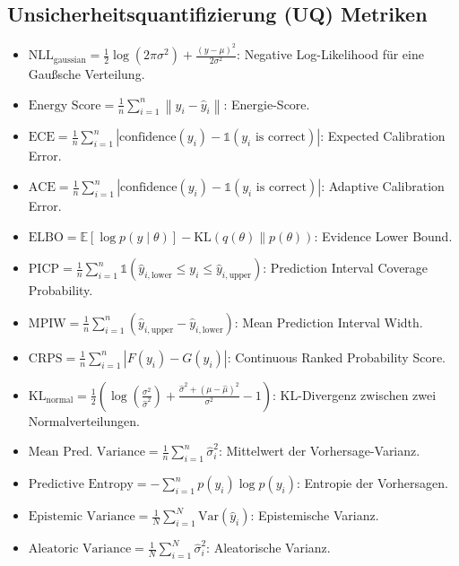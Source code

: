 \documentclass[headsepline,footsepline,footinclude=false,oneside,fontsize=11pt,paper=a4,listof=totoc,bibliography=totoc]{scrbook} %
\begin{document}
\subsection*{Unsicherheitsquantifizierung (UQ) Metriken}
\begin{itemize}
  \item \( \text{NLL}_{\text{gaussian}} = \frac{1}{2} \log(2 \pi \sigma^2) + \frac{(y - \mu)^2}{2 \sigma^2} \): Negative Log-Likelihood für eine Gaußsche Verteilung.
  \item \( \text{Energy Score} = \frac{1}{n} \sum_{i=1}^{n} \left\| y_i - \hat{y}_i \right\| \): Energie-Score.
  \item \( \text{ECE} = \frac{1}{n} \sum_{i=1}^{n} \left| \text{confidence}(y_i) - \mathbb{1}(y_i \text{ is correct}) \right| \): Expected Calibration Error.
  \item \( \text{ACE} = \frac{1}{n} \sum_{i=1}^{n} \left| \text{confidence}(y_i) - \mathbb{1}(y_i \text{ is correct}) \right| \): Adaptive Calibration Error.
  \item \( \text{ELBO} = \mathbb{E}[\log p(y \mid \theta)] - \text{KL}(q(\theta) \parallel p(\theta)) \): Evidence Lower Bound.
  \item \( \text{PICP} = \frac{1}{n} \sum_{i=1}^{n} \mathbb{1}(\hat{y}_{i,\text{lower}} \leq y_i \leq \hat{y}_{i,\text{upper}}) \): Prediction Interval Coverage Probability.
  \item \( \text{MPIW} = \frac{1}{n} \sum_{i=1}^{n} (\hat{y}_{i,\text{upper}} - \hat{y}_{i,\text{lower}}) \): Mean Prediction Interval Width.
  \item \( \text{CRPS} = \frac{1}{n} \sum_{i=1}^{n} \left| F(y_i) - G(y_i) \right| \): Continuous Ranked Probability Score.
  \item \( \text{KL}_{\text{normal}} = \frac{1}{2} \left( \log\left(\frac{\sigma^2}{\hat{\sigma}^2}\right) + \frac{\hat{\sigma}^2 + (\mu - \hat{\mu})^2}{\sigma^2} - 1 \right) \): KL-Divergenz zwischen zwei Normalverteilungen.
  \item \( \text{Mean Pred. Variance} = \frac{1}{n} \sum_{i=1}^{n} \hat{\sigma}_i^2 \): Mittelwert der Vorhersage-Varianz.
  \item \( \text{Predictive Entropy} = - \sum_{i=1}^{n} p(y_i) \log p(y_i) \): Entropie der Vorhersagen.
  \item \( \text{Epistemic Variance} = \frac{1}{N} \sum_{i=1}^{N} \text{Var}(\hat{y}_i) \): Epistemische Varianz.
  \item \( \text{Aleatoric Variance} = \frac{1}{N} \sum_{i=1}^{N} \hat{\sigma}_i^2 \): Aleatorische Varianz.

\end{itemize}
\end{document}
